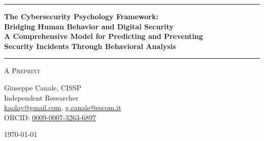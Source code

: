 \documentclass[11pt,a4paper]{article}
\begin{document}
\thispagestyle{empty}
\begin{center}

\vspace*{0.5cm}

\rule{\textwidth}{1.5pt}

\vspace{0.5cm}

{\LARGE \textbf{The Cybersecurity Psychology Framework:}}\\[0.3cm]
{\LARGE \textbf{Bridging Human Behavior and Digital Security}}\\[0.3cm]
{\LARGE \textbf{A Comprehensive Model for Predicting and Preventing}}\\[0.3cm]
{\LARGE \textbf{Security Incidents Through Behavioral Analysis}}

\vspace{0.5cm}

\rule{\textwidth}{1.5pt}

\vspace{0.3cm}

{\large \textsc{A Preprint}}

\vspace{0.5cm}

{\Large Giuseppe Canale, CISSP}\\[0.2cm]
Independent Researcher\\[0.1cm]
\href{mailto:kaolay@gmail.com}{kaolay@gmail.com}, 
\href{mailto:g.canale@escom.it}{g.canale@escom.it}\\[0.1cm]
ORCID: \href{https://orcid.org/0009-0007-3263-6897}{0009-0007-3263-6897}

\vspace{0.8cm}

{\large \today}

\vspace{1cm}

\end{center}
\end{document}
